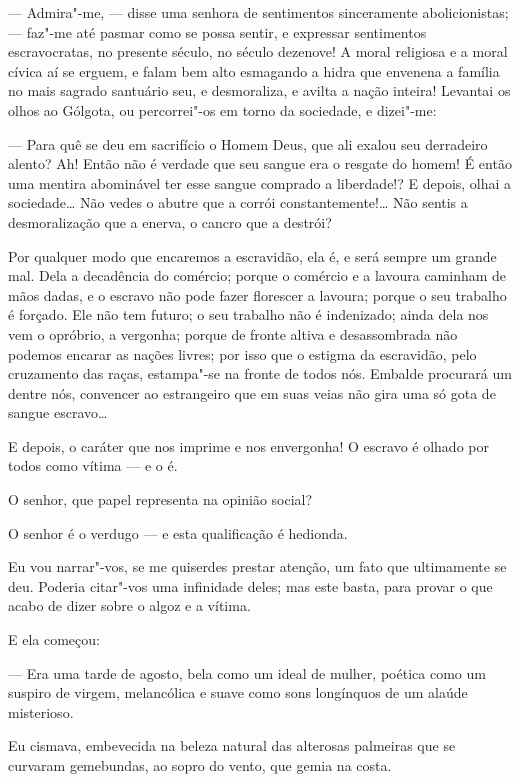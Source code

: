 --- Admira"-me, --- disse uma senhora de sentimentos sinceramente
abolicionistas; --- faz"-me até pasmar como se possa sentir, e expressar
sentimentos escravocratas, no presente século, no século dezenove! A
moral religiosa e a moral cívica aí se erguem, e falam bem alto
esmagando a hidra que envenena a família no mais sagrado santuário seu,
e desmoraliza, e avilta a nação inteira! Levantai os olhos ao Gólgota,
ou percorrei"-os em torno da sociedade, e dizei"-me:

--- Para quê se deu em sacrifício o Homem Deus, que ali exalou seu
derradeiro alento? Ah! Então não é verdade que seu sangue era o resgate
do homem! É então uma mentira abominável ter esse sangue comprado a
liberdade!? E depois, olhai a sociedade\ldots{} Não vedes o abutre que a
corrói constantemente!\ldots{} Não sentis a desmoralização que a enerva, o
cancro que a destrói?

Por qualquer modo que encaremos a escravidão, ela é, e será sempre um
grande mal. Dela a decadência do comércio; porque o comércio e a lavoura
caminham de mãos dadas, e o escravo não pode fazer florescer a lavoura;
porque o seu trabalho é forçado. Ele não tem futuro; o seu trabalho não
é indenizado; ainda dela nos vem o opróbrio, a vergonha; porque de
fronte altiva e desassombrada não podemos encarar as nações livres; por
isso que o estigma da escravidão, pelo cruzamento das raças, estampa"-se
na fronte de todos nós. Embalde procurará um dentre nós, convencer ao
estrangeiro que em suas veias não gira uma só gota de sangue escravo\ldots{}

E depois, o caráter que nos imprime e nos envergonha! O escravo é olhado
por todos como vítima --- e o é.

O senhor, que papel representa na opinião social?

O senhor é o verdugo --- e esta qualificação é hedionda.

Eu vou narrar"-vos, se me quiserdes prestar atenção, um fato que
ultimamente se deu. Poderia citar"-vos uma infinidade deles; mas este
basta, para provar o que acabo de dizer sobre o algoz e a vítima.

E ela começou:

--- Era uma tarde de agosto, bela como um ideal de mulher, poética como
um suspiro de virgem, melancólica e suave como sons longínquos de um
alaúde misterioso.

Eu cismava, embevecida na beleza natural das alterosas palmeiras que se
curvaram gemebundas, ao sopro do vento, que gemia na costa.

